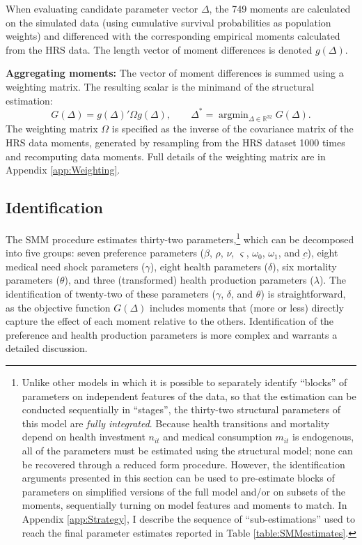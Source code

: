 \documentclass[12pt,pdftex,letterpaper]{article}
\DeclareMathOperator*{\argmin}{argmin}
\newcommand{\R}{\mathbb{R}}
\newcommand{\Con}{c}
\newcommand{\Care}{m}
\newcommand{\Invst}{n}
\newcommand{\MedShkParam}{\gamma}
\newcommand{\DiscFac}{\beta}
\newcommand{\ConFloor}{\underbar{\Con}}
\newcommand{\LifeUtility}{\varsigma}
\newcommand{\CRRAcon}{\rho}
\newcommand{\CRRAcare}{\nu}
\newcommand{\HealthParam}{\delta}
\newcommand{\MortParam}{\theta}
\newcommand{\BequestParam}{\omega}
\newcommand{\HealthProdParamAlt}{\lambda}
\begin{document}
When evaluating candidate parameter vector $\Delta$, the 749 moments are calculated on the simulated data (using cumulative survival probabilities as population weights) and differenced with the corresponding empirical moments calculated from the HRS data.  The length vector of moment differences is denoted $g(\Delta)$.

\vspace{0.5cm}

\noindent \textbf{Aggregating moments:} The vector of moment differences is summed using a weighting matrix.  The resulting scalar is the minimand of the structural estimation:
\begin{equation}
G(\Delta) = g(\Delta)' \Omega g(\Delta), \qquad \Delta^* = \argmin_{\Delta \in \R^{32}} G(\Delta).
\end{equation}
The weighting matrix $\Omega$ is specified as the inverse of the covariance matrix of the HRS data moments, generated by resampling from the HRS dataset 1000 times and recomputing data moments.  Full details of the weighting matrix are in Appendix \ref{app:Weighting}.


\subsection{Identification}
\label{sec:Ident}

The SMM procedure estimates thirty-two parameters,\footnote{Unlike other models in which it is possible to separately identify ``blocks'' of parameters on independent features of the data, so that the estimation can be conducted sequentially in ``stages'', the thirty-two structural parameters of this model are \textit{fully integrated}.  Because health transitions and mortality depend on health investment $\Invst_{it}$ and medical consumption $\Care_{it}$ is endogenous, all of the parameters must be estimated using the structural model; none can be recovered through a reduced form procedure.  However, the identification arguments presented in this section can be used to pre-estimate blocks of parameters on simplified versions of the full model and/or on subsets of the moments, sequentially turning on model features and moments to match.  In Appendix \ref{app:Strategy}, I describe the sequence of ``sub-estimations'' used to reach the final parameter estimates reported in Table \ref{table:SMMestimates}.} which can be decomposed into five groups: seven preference parameters ($\DiscFac$, $\CRRAcon$, $\CRRAcare$, $\LifeUtility$, $\BequestParam_0$, $\BequestParam_1$, and $\ConFloor$), eight medical need shock parameters ($\MedShkParam$), eight health parameters ($\HealthParam$), six mortality parameters ($\MortParam$), and three (transformed) health production parameters ($\HealthProdParamAlt$).  The identification of twenty-two of these parameters ($\MedShkParam$, $\HealthParam$, and $\MortParam$) is straightforward, as the objective function $G(\Delta)$ includes moments that (more or less) directly capture the effect of each moment relative to the others.  Identification of the preference and health production parameters is more complex and warrants a detailed discussion.
\end{document}
